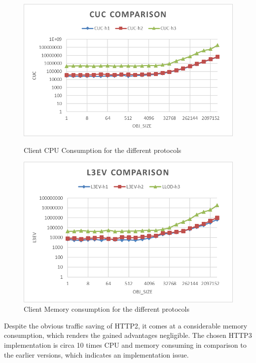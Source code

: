 \documentclass[runningheads]{llncs}
\begin{document}
\begin{figure}[H]
    \centering
    \begin{minipage}{0.49\textwidth}
        \centering
        \includegraphics[width=1\textwidth]{cuc-h2load-mistral.png}
        \caption{Client CPU Consumption for the different protocols}
		\label {fig:cuc-comp}
    \end{minipage}\hfill
    \begin{minipage}{0.49\textwidth}
        \centering
        \includegraphics[width=1\textwidth]{l3ev-h2load-mistral.png}
        \caption{Client Memory consumption for the different protocols}
		\label {fig:llod-comp}
    \end{minipage}
\end{figure}


Despite the obvious traffic saving of HTTP2, it comes at a considerable memory consumption, which renders the gained advantages negligible. The chosen HTTP3 implementation is circa 10 times CPU and memory consuming in comparison to the earlier versions, which indicates an implementation issue.
\end{document}
